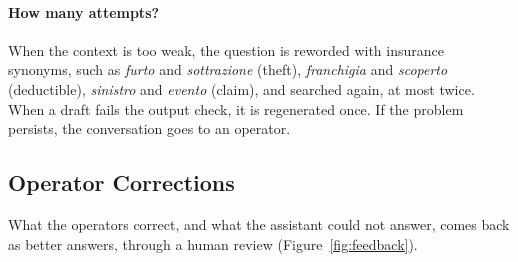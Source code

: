 \paragraph{How many attempts?} When the context is too weak, the question is reworded with
insurance synonyms, such as \textit{furto} and \textit{sottrazione} (theft), \textit{franchigia} and
\textit{scoperto} (deductible), \textit{sinistro} and \textit{evento} (claim), and searched again, at
most twice. When a draft fails the output check, it is regenerated once. If the problem persists,
the conversation goes to an operator.

\needspace{7cm}
\subsection{Operator Corrections}
\label{sec:corrections}

What the operators correct, and what the assistant could not answer, comes back as better
answers, through a human review (Figure~\ref{fig:feedback}).


